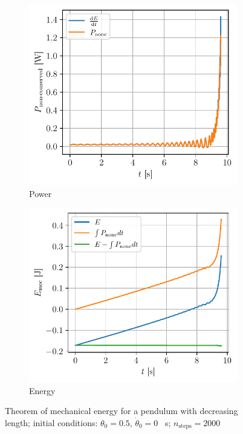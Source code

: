\begin{figure}[h]
    \centering
    \begin{subfigure}{0.48\linewidth}
        \centering
        \includegraphics[width=\linewidth]{figures/retract_power.pdf}
        \caption{Power}
        \label{fig:retract_power}
    \end{subfigure}
    \begin{subfigure}{0.48\linewidth}
        \centering
        \includegraphics[width=\linewidth]{figures/retract_energy.pdf}
        \caption{Energy}
        \label{fig:retract_energy}
    \end{subfigure}
    \caption{Theorem of mechanical energy for a pendulum with decreasing length; initial conditions: $\theta_0 = 0.5$, $\dot{\theta}_0 = 0$ \si{\per\second}; $n_\textrm{steps}=2000$}
\end{figure}
